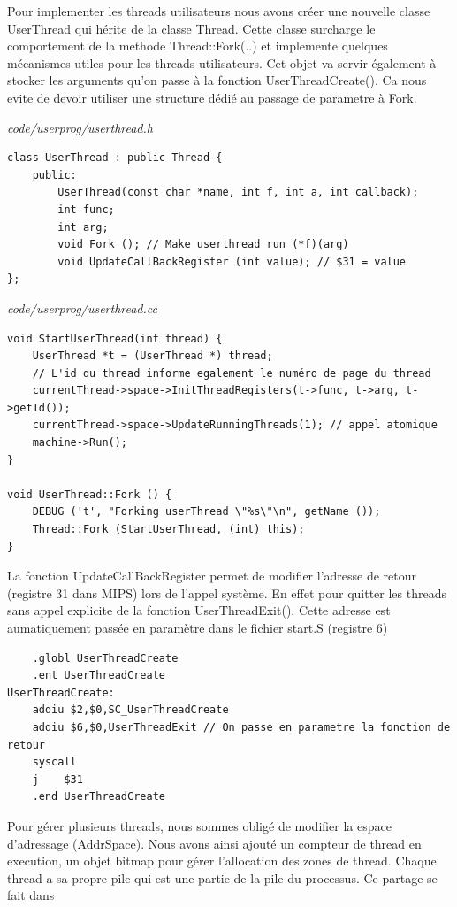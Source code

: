 \documentclass[a4paper,10pt]{article}
\begin{document}
Pour implementer les threads utilisateurs nous avons créer une nouvelle classe
UserThread qui hérite de la classe Thread. Cette classe surcharge le
comportement de la methode Thread::Fork(..) et implemente quelques mécanismes
utiles pour les threads utilisateurs. Cet objet va servir également à stocker
les arguments qu'on passe à la fonction UserThreadCreate(). Ca nous evite de
devoir utiliser une structure dédié au passage de parametre à Fork.

\textit{code/userprog/userthread.h}
\begin{lstlisting}
class UserThread : public Thread {
    public:
        UserThread(const char *name, int f, int a, int callback);
        int func;
        int arg;
        void Fork (); // Make userthread run (*f)(arg)
        void UpdateCallBackRegister (int value); // $31 = value
};
\end{lstlisting}

\textit{code/userprog/userthread.cc}
\begin{lstlisting}
void StartUserThread(int thread) {
    UserThread *t = (UserThread *) thread;
    // L'id du thread informe egalement le numéro de page du thread
    currentThread->space->InitThreadRegisters(t->func, t->arg, t->getId());
    currentThread->space->UpdateRunningThreads(1); // appel atomique
    machine->Run();
}

void UserThread::Fork () {
    DEBUG ('t', "Forking userThread \"%s\"\n", getName ());
    Thread::Fork (StartUserThread, (int) this);
}
\end{lstlisting}

La fonction UpdateCallBackRegister permet de modifier l'adresse de retour
(registre 31 dans MIPS) lors de l'appel système. En effet pour quitter les
threads sans appel explicite de la fonction UserThreadExit(). Cette adresse est
aumatiquement passée en paramètre dans le fichier start.S (registre 6)

\begin{lstlisting}
    .globl UserThreadCreate
    .ent UserThreadCreate
UserThreadCreate:
    addiu $2,$0,SC_UserThreadCreate
    addiu $6,$0,UserThreadExit // On passe en parametre la fonction de retour
    syscall
    j    $31
    .end UserThreadCreate
\end{lstlisting}

Pour gérer plusieurs threads, nous sommes obligé de modifier la espace
d'adressage (AddrSpace). Nous avons ainsi ajouté un compteur de thread en
execution, un objet bitmap pour gérer l'allocation des zones de thread. Chaque
thread a sa propre pile qui est une partie de la pile du processus. Ce partage
se fait dans 
\end{document}
